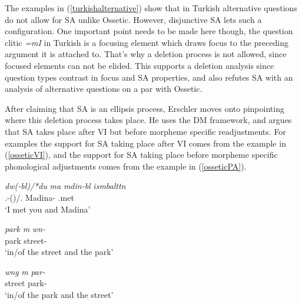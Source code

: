 The examples in (\ref{turkishalternative}) show that in Turkish alternative questions do not allow for SA unlike Ossetic. However, disjunctive SA lets such a configuration. One important point needs to be made here though, the question clitic \textit{=mI} in Turkish is a focusing element which draws focus to the preceding argument it is attached to. That's why a deletion process is not allowed, since focused elements can not be elided. This supports a deletion analysis since question types contrast in focus and SA properties, and also refutes SA with an analysis of alternative questions on a par with Ossetic.

After claiming that SA is an ellipsis process, Erschler moves onto pinpointing where this deletion process takes place. He uses the DM framework, and argues that SA takes place after VI but before morpheme specific readjustments. For examples the support for SA taking place after VI comes from the example in (\ref{osseticVI}), and the support for SA taking place before morpheme specific phonological adjustments comes from the example in (\ref{osseticPA}).

\begin{exe}

    \ex \begin{xlist}
    \ex \label{osseticVI}
    \gll 
    \textit{d\textturna w(-b\textturna l)/*du} \textit{\textturna ma} \textit{m\textturna din\textturna-b\textturna l} \textit{is\textturna mbaltt\textturna n} \\ {\Second}{\Sg}.{\Obl}-({\Sup})/{\Second}{\Sg}.{\Nom} {\And} Madina-{\Sup} {\First}{\Sg}.met \\
    \glt `I met you and Madina'
    
    \ex \label{osseticPA}
    \begin{xlisti}
    \ex
    \gll 
    \textit{park} \textit{\textturna m\textturna} \textit{w\textschwa n\textdyoghlig-\textschwa} \\ park {\And} street-{\Obl} \\
    \glt `in/of the street and the park'
    
    \ex 
    \gll 
    \textit{w\textschwa ng} \textit{\textturna m\textturna} \textit{par\textteshlig-\textschwa} \\ street {\And} park-{\Obl} \\
    \glt `in/of the park and the street'
    \end{xlisti}
    \end{xlist}
\end{exe}


